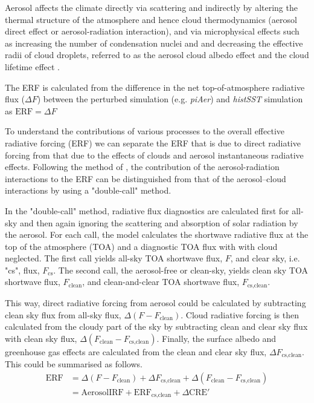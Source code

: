Aerosol affects the climate directly via scattering and indirectly by altering the thermal structure of the atmosphere and hence cloud thermodynamics (aerosol direct effect or aerosol-radiation interaction), and via microphysical effects such as increasing the number of condensation nuclei and and decreasing the effective radii of cloud droplets, referred to as the aerosol cloud albedo effect and the cloud lifetime effect \citep{twomeyInfluencePollutionShortwave1977}.

The ERF is calculated from the difference in the net top-of-atmosphere radiative flux ($\Delta F$) between the perturbed simulation (e.g. \textit{piAer}) and \textit{histSST} simulation as  $\text{ERF} = \Delta F$

To understand the contributions of various processes to the overall effective radiative forcing (ERF) we can separate the ERF that is due to direct radiative forcing from that due to the effects of clouds and aerosol instantaneous radiative effects. Following the method of \citet{ghanTechnicalNoteEstimating2013}, the contribution of the aerosol-radiation interactions to the ERF can be distinguished from that of the aerosol–cloud interactions by using a "double-call" method.

In the "double-call" method, radiative flux diagnostics are calculated first for all-sky and then again ignoring the scattering and absorption of solar radiation by the aerosol. For each call, the model calculates the shortwave radiative flux at the top of the atmosphere (TOA) and a diagnostic TOA flux with with cloud neglected. The first call yields all-sky TOA shortwave flux, $F$, and clear sky, i.e. "cs", flux, $F_{\text{cs}}$. The second call, the aerosol-free or clean-sky, yields clean sky TOA shortwave flux, $F_{\text{clean}}$, and clean-and-clear TOA shortwave flux, $F_{\text{cs,clean}}$.

This way, direct radiative forcing from aerosol could be calculated by subtracting clean sky flux from all-sky flux, $\Delta (F - F_{\text{clean}})$. Cloud radiative forcing is then calculated from the cloudy part of the sky by subtracting clean and clear sky flux with clean sky flux, $\Delta (F_{\text{clean}} - F_{\text{cs,clean}})$. Finally, the surface albedo and greenhouse gas effects are calculated from the clean and clear sky flux, $\Delta F_{\text{cs,clean}}$. This could be summarised as follows.
\begin{equation} \label{eq:erf}
\begin{split}
\text{ERF} &=  \Delta(F-F_{\text{clean}}) + \Delta F_{\text{cs,clean}} + \Delta ({F_{\text{clean}}-F_{\text{cs,clean}}}) \\
 & = \text{AerosolIRF} + \text{ERF}_{\text{cs,clean}}+\Delta \text{CRE}'
\end{split}
\end{equation}

